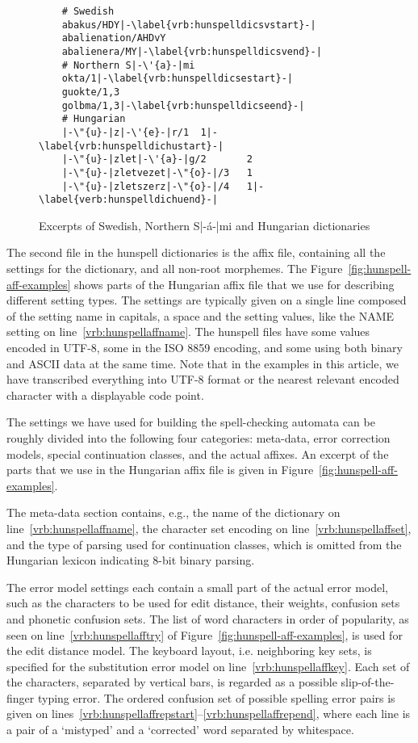 \documentclass[a4paper,runningheads]{llncs}
\begin{document}
\begin{figure}[tbp]
  \centering
  \begin{lstlisting}
    # Swedish
    abakus/HDY|-\label{vrb:hunspelldicsvstart}-|
    abalienation/AHDvY
    abalienera/MY|-\label{vrb:hunspelldicsvend}-|
    # Northern S|-\'{a}-|mi
    okta/1|-\label{vrb:hunspelldicsestart}-|
    guokte/1,3
    golbma/1,3|-\label{vrb:hunspelldicseend}-|
    # Hungarian
    |-\"{u}-|z|-\'{e}-|r/1  1|-\label{vrb:hunspelldichustart}-|
    |-\"{u}-|zlet|-\'{a}-|g/2       2
    |-\"{u}-|zletvezet|-\"{o}-|/3   1
    |-\"{u}-|zletszerz|-\"{o}-|/4   1|-\label{verb:hunspelldichuend}-|
  \end{lstlisting}
  \caption{Excerpts of Swedish, Northern S|-\'{a}-|mi and Hungarian dictionaries}
  \label{fig:hunspell-dic-examples}
\end{figure}

The second file in the hunspell dictionaries is the affix file,
containing all the settings for the dictionary, and all non-root
morphemes. The Figure~\ref{fig:hunspell-aff-examples} shows parts of
the Hungarian affix file that we use for describing different setting
types.  The settings are typically given on a single line composed of
the setting name in capitals, a space and the setting values, like the
NAME setting on line~\ref{vrb:hunspellaffname}. The hunspell files
have some values encoded in UTF-8, some in the ISO 8859 encoding, and
some using both binary and ASCII data at the same time. Note that in the examples in this article, we have
transcribed everything into UTF-8 format or the nearest relevant encoded
character with a displayable code point.

The settings we have used for building the spell-checking automata can
be roughly divided into the following four categories: meta-data, error
correction models, special continuation classes, and the actual
affixes. An excerpt of the parts that we use in the Hungarian affix file
is given in Figure~\ref{fig:hunspell-aff-examples}.

The meta-data section contains, e.g., the name of the dictionary on
line~\ref{vrb:hunspellaffname}, the character set encoding on
line~\ref{vrb:hunspellaffset}, and the type of parsing used for
continuation classes, which is omitted from the Hungarian lexicon
indicating 8-bit binary parsing.

The error model settings each contain a small part of the actual error
model, such as the characters to be used for edit distance, their weights,
confusion sets and phonetic confusion sets. The list of word
characters in order of popularity, as seen on
line~\ref{vrb:hunspellafftry} of
Figure~\ref{fig:hunspell-aff-examples}, is used for the edit distance
model. The keyboard layout, i.e. neighboring key sets, is specified
for the substitution error model on
line~\ref{vrb:hunspellaffkey}. Each set of the characters, separated by
vertical bars, is regarded as a possible slip-of-the-finger typing
error. The ordered confusion set of possible spelling error pairs is
given on
lines~\ref{vrb:hunspellaffrepstart}--\ref{vrb:hunspellaffrepend},
where each line is a pair of a `mistyped' and a `corrected' word
separated by whitespace.
\end{document}
